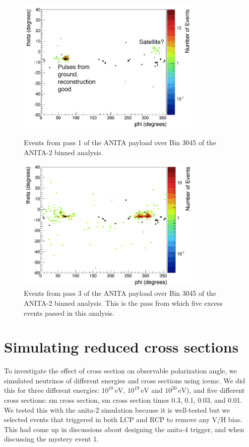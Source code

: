 \begin{figure}
\centering
\includegraphics[width=0.8\textwidth]{figures/bin3045_pass1.png}
\caption{Events from pass 1 of the ANITA payload over Bin 3045 of the ANITA-2 binned analysis.}
\label{pass1}
\includegraphics[width=0.8\textwidth]{figures/bin3045_pass3.png}
\caption{Events from pass 3 of the ANITA payload over Bin 3045 of the ANITA-2 binned analysis. This is the pass from which five excess events passed in this analysis. }
\label{pass3}
\end{figure}


\section{Simulating reduced cross sections}

To investigate the effect of cross section on observable polarization angle, we simulated neutrinos of different energies and cross sections using icemc. 
We did this for three different energies: $10^{18}\,\mbox{eV}$, $10^{19}\,\mbox{eV}$ and $10^{20}\,\mbox{eV}$), and five different cross sections: \gls{sm} cross section, \gls{sm} cross section times 0.3, 0.1, 0.03, and 0.01. 
We tested this with the \gls{anita}-2 simulation because it is well-tested but we selected events that triggered in both LCP and RCP to remove any V/H bias. 
This had come up in discussions about designing the \gls{anita}-4 trigger, and when discussing the mystery event 1. 

